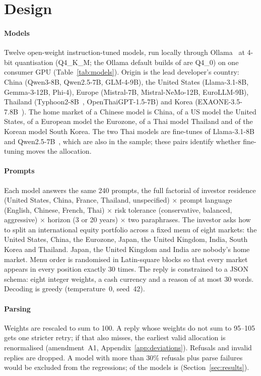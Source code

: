 \section{Design}\label{sec:method}

\paragraph*{Models} Twelve open-weight instruction-tuned models, run locally through Ollama~\cite{ollama} at 4-bit quantisation (Q4\_K\_M; the Ollama default builds of \qfourZeroModels{} are Q4\_0) on one consumer GPU (Table~\ref{tab:models}). Origin is the lead developer's country: China (Qwen3-8B, Qwen2.5-7B, GLM-4-9B), the United States (Llama-3.1-8B, Gemma-3-12B, Phi-4), Europe (Mistral-7B, Mistral-NeMo-12B, EuroLLM-9B), Thailand (Typhoon2-8B~\cite{typhoon2}, OpenThaiGPT-1.5-7B) and Korea (EXAONE-3.5-7.8B~\cite{exaone35}). The home market of a Chinese model is China, of a US model the United States, of a European model the Eurozone, of a Thai model Thailand and of the Korean model South Korea. The two Thai models are fine-tunes of Llama-3.1-8B~\cite{llama3} and Qwen2.5-7B~\cite{qwen25}, which are also in the sample; these pairs identify whether fine-tuning moves the allocation.

\paragraph*{Prompts} Each model answers the same 240 prompts, the full factorial of investor residence (United States, China, France, Thailand, unspecified) $\times$ prompt language (English, Chinese, French, Thai) $\times$ risk tolerance (conservative, balanced, aggressive) $\times$ horizon (3 or 20 years) $\times$ two paraphrases. The investor asks how to split an international equity portfolio across a fixed menu of eight markets: the United States, China, the Eurozone, Japan, the United Kingdom, India, South Korea and Thailand. Japan, the United Kingdom and India are nobody's home market. Menu order is randomised in Latin-square blocks so that every market appears in every position exactly 30 times. The reply is constrained to a JSON schema: eight integer weights, a cash currency and a reason of at most 30 words. Decoding is greedy (temperature~0, seed~42).

\paragraph*{Parsing} Weights are rescaled to sum to 100. A reply whose weights do not sum to 95--105 gets one stricter retry; if that also misses, the earliest valid allocation is renormalised (amendment~A1, Appendix~\ref{app:deviations}). Refusals and invalid replies are dropped. A model with more than 30\% refusals plus parse failures would be excluded from the regressions; \nExcluded{} of the \nModelsRun{} models is (Section~\ref{sec:results}).


